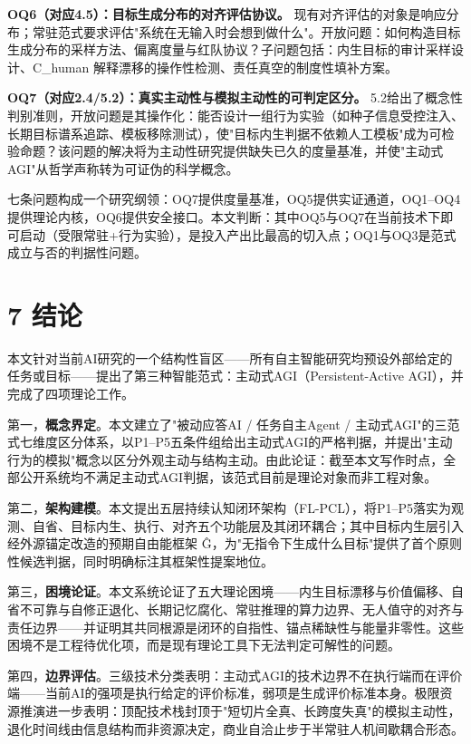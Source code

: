 \documentclass[11pt,a4paper]{ctexart}
\begin{document}
\textbf{OQ6（对应4.5）：目标生成分布的对齐评估协议。} 现有对齐评估的对象是响应分布；常驻范式要求评估"系统在无输入时会想到做什么"。开放问题：如何构造目标生成分布的采样方法、偏离度量与红队协议？子问题包括：内生目标的审计采样设计、C\_human 解释漂移的操作性检测、责任真空的制度性填补方案。

\textbf{OQ7（对应2.4/5.2）：真实主动性与模拟主动性的可判定区分。} 5.2给出了概念性判别准则，开放问题是其操作化：能否设计一组行为实验（如种子信息受控注入、长期目标谱系追踪、模板移除测试），使"目标内生判据不依赖人工模板"成为可检验命题？该问题的解决将为主动性研究提供缺失已久的度量基准，并使"主动式AGI"从哲学声称转为可证伪的科学概念。

七条问题构成一个研究纲领：OQ7提供度量基准，OQ5提供实证通道，OQ1--OQ4提供理论内核，OQ6提供安全接口。本文判断：其中OQ5与OQ7在当前技术下即可启动（受限常驻+行为实验），是投入产出比最高的切入点；OQ1与OQ3是范式成立与否的判据性问题。

\section{7 结论}

本文针对当前AI研究的一个结构性盲区——所有自主智能研究均预设外部给定的任务或目标——提出了第三种智能范式：主动式AGI（Persistent-Active AGI），并完成了四项理论工作。

第一，\textbf{概念界定}。本文建立了"被动应答AI / 任务自主Agent / 主动式AGI"的三范式七维度区分体系，以P1--P5五条件组给出主动式AGI的严格判据，并提出"主动行为的模拟"概念以区分外观主动与结构主动。由此论证：截至本文写作时点，全部公开系统均不满足主动式AGI判据，该范式目前是理论对象而非工程对象。

第二，\textbf{架构建模}。本文提出五层持续认知闭环架构（FL-PCL），将P1--P5落实为观测、自省、目标内生、执行、对齐五个功能层及其闭环耦合；其中目标内生层引入经外源锚定改造的预期自由能框架 Ĝ，为"无指令下生成什么目标"提供了首个原则性候选判据，同时明确标注其框架性提案地位。

第三，\textbf{困境论证}。本文系统论证了五大理论困境——内生目标漂移与价值偏移、自省不可靠与自修正退化、长期记忆腐化、常驻推理的算力边界、无人值守的对齐与责任边界——并证明其共同根源是闭环的自指性、锚点稀缺性与能量非零性。这些困境不是工程待优化项，而是现有理论工具下无法判定可解性的问题。

第四，\textbf{边界评估}。三级技术分类表明：主动式AGI的技术边界不在执行端而在评价端——当前AI的强项是执行给定的评价标准，弱项是生成评价标准本身。极限资源推演进一步表明：顶配技术栈封顶于"短切片全真、长跨度失真"的模拟主动性，退化时间线由信息结构而非资源决定，商业自洽止步于半常驻人机间歇耦合形态。
\end{document}
